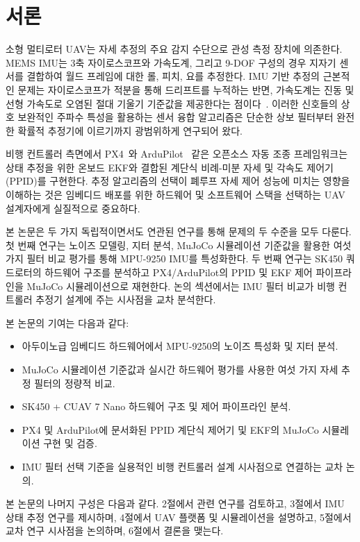 \section{서론}

소형 멀티로터 UAV는 자세 추정의 주요 감지 수단으로 관성 측정 장치에 의존한다.
MEMS IMU는 3축 자이로스코프와 가속도계, 그리고 9-DOF 구성의 경우 지자기 센서를 결합하여
월드 프레임에 대한 롤, 피치, 요를 추정한다.
IMU 기반 추정의 근본적인 문제는 자이로스코프가 적분을 통해 드리프트를 누적하는 반면,
가속도계는 진동 및 선형 가속도로 오염된 절대 기울기 기준값을 제공한다는 점이다~\cite{woodman2007}.
이러한 신호들의 상호 보완적인 주파수 특성을 활용하는 센서 융합 알고리즘은
단순한 상보 필터부터 완전한 확률적 추정기에 이르기까지 광범위하게 연구되어 왔다.

비행 컨트롤러 측면에서 PX4~\cite{px4docs}와 ArduPilot~\cite{ardupilotdocs} 같은
오픈소스 자동 조종 프레임워크는 상태 추정을 위한 온보드 EKF와 결합된
계단식 비례-미분 자세 및 각속도 제어기(PPID)를 구현한다.
추정 알고리즘의 선택이 폐루프 자세 제어 성능에 미치는 영향을 이해하는 것은
임베디드 배포를 위한 하드웨어 및 소프트웨어 스택을 선택하는 UAV 설계자에게 실질적으로 중요하다.

본 논문은 두 가지 독립적이면서도 연관된 연구를 통해 문제의 두 수준을 모두 다룬다.
첫 번째 연구는 노이즈 모델링, 지터 분석, MuJoCo 시뮬레이션 기준값을 활용한
여섯 가지 필터 비교 평가를 통해 MPU-9250 IMU를 특성화한다.
두 번째 연구는 SK450 쿼드로터의 하드웨어 구조를 분석하고
PX4/ArduPilot의 PPID 및 EKF 제어 파이프라인을 MuJoCo 시뮬레이션으로 재현한다.
논의 섹션에서는 IMU 필터 비교가 비행 컨트롤러 추정기 설계에 주는 시사점을 교차 분석한다.

본 논문의 기여는 다음과 같다:
\begin{itemize}
    \item 아두이노급 임베디드 하드웨어에서 MPU-9250의 노이즈 특성화 및 지터 분석.
    \item MuJoCo 시뮬레이션 기준값과 실시간 하드웨어 평가를 사용한 여섯 가지 자세 추정 필터의 정량적 비교.
    \item SK450 + CUAV 7 Nano 하드웨어 구조 및 제어 파이프라인 분석.
    \item PX4 및 ArduPilot에 문서화된 PPID 계단식 제어기 및 EKF의 MuJoCo 시뮬레이션 구현 및 검증.
    \item IMU 필터 선택 기준을 실용적인 비행 컨트롤러 설계 시사점으로 연결하는 교차 논의.
\end{itemize}

본 논문의 나머지 구성은 다음과 같다.
2절에서 관련 연구를 검토하고,
3절에서 IMU 상태 추정 연구를 제시하며,
4절에서 UAV 플랫폼 및 시뮬레이션을 설명하고,
5절에서 교차 연구 시사점을 논의하며,
6절에서 결론을 맺는다.
